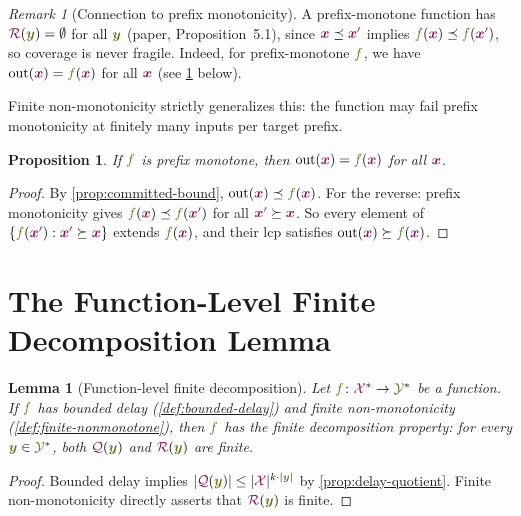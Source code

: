 \documentclass{article}
\newcommand{\Quotient}{{\color{TokenColor}\mathcal{Q}}}
\newcommand{\Remainder}{{\color{TokenColor}\mathcal{R}}}
\newcommand{\transFnSym}[0]{f}
\newcommand{\transFn}{\ensuremath{{\color{CharacterColor}\transFnSym}}\xspace}
\newcommand{\srcStr}{\ensuremath{{\color{TokenColor}\boldsymbol{x}}}\xspace}
\newcommand{\srcStrp}{\ensuremath{{\color{TokenColor}\boldsymbol{x}^\prime}}\xspace}
\newcommand{\tgtStr}{{\color{CharacterColor}\boldsymbol{y}}}
\newcommand{\srcAlphabet}[0]{{\color{TokenColor}\ensuremath{\mathcal{X}}}\xspace}
\newcommand{\tgtAlphabet}[0]{{\color{CharacterColor}\ensuremath{\mathcal{Y}}}\xspace}
\newcommand{\srcStrings}[0]{\ensuremath{\srcAlphabet^*}\xspace}
\newcommand{\tgtStrings}[0]{\ensuremath{\tgtAlphabet^*}\xspace}
\newcommand{\committed}{\mathrm{out}}
\theoremstyle{plain}
\newtheorem{proposition}[theorem]{Proposition}
\newtheorem{lemma}[theorem]{Lemma}
\theoremstyle{definition}
\theoremstyle{remark}
\newtheorem{remark}[theorem]{Remark}
\begin{document}
\begin{remark}[Connection to prefix monotonicity]
A prefix-monotone function has $\Remainder(\tgtStr) = \emptyset$ for all
$\tgtStr$ (paper, Proposition~5.1), since $\srcStr \preceq \srcStrp$ implies
$\transFn(\srcStr) \preceq \transFn(\srcStrp)$, so coverage is never
fragile.  Indeed, for prefix-monotone $\transFn$, we have
$\committed(\srcStr) = \transFn(\srcStr)$ for all $\srcStr$
(see \cref{prop:prefix-monotone-committed} below).

Finite non-monotonicity strictly generalizes this: the function
may fail prefix monotonicity at finitely many inputs per target prefix.
\end{remark}

\begin{proposition}
\label{prop:prefix-monotone-committed}
If $\transFn$ is prefix monotone, then $\committed(\srcStr) = \transFn(\srcStr)$ for all $\srcStr$.
\end{proposition}
\begin{proof}
By \cref{prop:committed-bound}, $\committed(\srcStr) \preceq \transFn(\srcStr)$.
For the reverse: prefix monotonicity gives $\transFn(\srcStr) \preceq
\transFn(\srcStrp)$ for all $\srcStrp \succeq \srcStr$.  So every element of
$\{\transFn(\srcStrp) : \srcStrp \succeq \srcStr\}$ extends $\transFn(\srcStr)$,
and their lcp satisfies $\committed(\srcStr) \succeq \transFn(\srcStr)$.
\end{proof}


\section{The Function-Level Finite Decomposition Lemma}
\label{sec:lemma}

\begin{lemma}[Function-level finite decomposition]
\label{lemma:function-level}
Let $\transFn \colon \srcStrings \to \tgtStrings$ be a function.  If $\transFn$
has bounded delay (\cref{def:bounded-delay}) and finite non-monotonicity
(\cref{def:finite-nonmonotone}), then $\transFn$ has the finite decomposition
property: for every $\tgtStr \in \tgtStrings$, both $\Quotient(\tgtStr)$ and
$\Remainder(\tgtStr)$ are finite.
\end{lemma}
\begin{proof}
Bounded delay implies $|\Quotient(\tgtStr)| \leq |\srcAlphabet|^{k \cdot |\tgtStr|}$ by \cref{prop:delay-quotient}.  Finite non-monotonicity directly asserts that $\Remainder(\tgtStr)$ is finite.
\end{proof}
\end{document}

